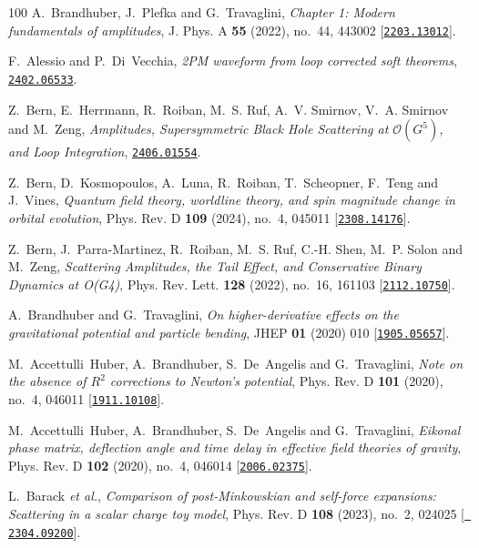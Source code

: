 \begin{thebibliography}{100}
A.~Brandhuber, J.~Plefka and G.~Travaglini,  {\em {Chapter 1: Modern
  fundamentals of amplitudes}}, J. Phys. A {\bf 55} (2022), no.~44, 443002
  [\href{http://www.arXiv.org/abs/2203.13012}{{\tt 2203.13012}}].

F.~Alessio and P.~Di~Vecchia,  {\em {2PM waveform from loop corrected soft
  theorems}}, \href{http://www.arXiv.org/abs/2402.06533}{{\tt 2402.06533}}.

Z.~Bern, E.~Herrmann, R.~Roiban, M.~S. Ruf, A.~V. Smirnov, V.~A. Smirnov and
  M.~Zeng,  {\em {Amplitudes, Supersymmetric Black Hole Scattering at
  $\mathcal{O}(G^5)$, and Loop Integration}},
  \href{http://www.arXiv.org/abs/2406.01554}{{\tt 2406.01554}}.

Z.~Bern, D.~Kosmopoulos, A.~Luna, R.~Roiban, T.~Scheopner, F.~Teng and
  J.~Vines,  {\em {Quantum field theory, worldline theory, and spin magnitude
  change in orbital evolution}}, Phys. Rev. D {\bf 109} (2024), no.~4, 045011
  [\href{http://www.arXiv.org/abs/2308.14176}{{\tt 2308.14176}}].

Z.~Bern, J.~Parra-Martinez, R.~Roiban, M.~S. Ruf, C.-H. Shen, M.~P. Solon and
  M.~Zeng,  {\em {Scattering Amplitudes, the Tail Effect, and Conservative
  Binary Dynamics at O(G4)}}, Phys. Rev. Lett. {\bf 128} (2022), no.~16, 161103
  [\href{http://www.arXiv.org/abs/2112.10750}{{\tt 2112.10750}}].

A.~Brandhuber and G.~Travaglini,  {\em {On higher-derivative effects on the
  gravitational potential and particle bending}}, JHEP {\bf 01} (2020) 010
  [\href{http://www.arXiv.org/abs/1905.05657}{{\tt 1905.05657}}].

M.~Accettulli~Huber, A.~Brandhuber, S.~De~Angelis and G.~Travaglini,  {\em
  {Note on the absence of $R^2$ corrections to Newton\textquoteright{}s
  potential}}, Phys. Rev. D {\bf 101} (2020), no.~4, 046011
  [\href{http://www.arXiv.org/abs/1911.10108}{{\tt 1911.10108}}].

M.~Accettulli~Huber, A.~Brandhuber, S.~De~Angelis and G.~Travaglini,  {\em
  {Eikonal phase matrix, deflection angle and time delay in effective field
  theories of gravity}}, Phys. Rev. D {\bf 102} (2020), no.~4, 046014
  [\href{http://www.arXiv.org/abs/2006.02375}{{\tt 2006.02375}}].

L.~Barack {\em et al.},  {\em {Comparison of post-Minkowskian and self-force
  expansions: Scattering in a scalar charge toy model}}, Phys. Rev. D {\bf 108}
  (2023), no.~2, 024025 [\href{http://www.arXiv.org/abs/2304.09200}{{\tt
  2304.09200}}].


\end{thebibliography}
